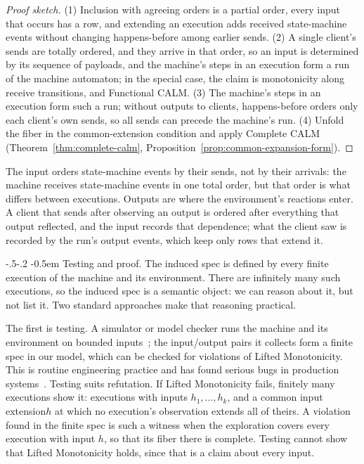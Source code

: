 \documentclass[sigconf]{cidr-2027}
\makeatletter
\theoremstyle{remark}
\renewcommand\paragraph{\@startsection{paragraph}{4}{\z@}%
  {-.5\baselineskip \@plus -2\p@ \@minus -.2\p@}%
  {-0.5em}%
  {\normalfont\bfseries}}
\newcommand{\indesc}{input extension\xspace} %
\newcommand{\outrel}{extends\xspace}          %
\newcommand{\outrelbase}{extend\xspace}       %
\makeatother
\begin{document}
\begin{proof}[Proof sketch]
(1) Inclusion with agreeing orders is a partial order, every input that occurs
has a row, and extending an execution adds received state-machine events without changing
happens-before among earlier sends.  (2) A single client's sends are totally
ordered, and they arrive in that order, so an input is determined by its
sequence of payloads, and the machine's steps in an execution form a run of
the machine automaton; in the special case, the claim is monotonicity along
receive transitions, and Functional CALM.  (3) The machine's steps in an
execution form such a run; without outputs to clients, happens-before orders
only each client's own sends, so all sends can precede the machine's run.  (4) Unfold the fiber in the
common-extension condition and apply Complete CALM
(Theorem~\ref{thm:complete-calm}, Proposition~\ref{prop:common-expansion-form}).
\end{proof}

The input orders state-machine events by their sends, not by their arrivals: the machine
receives state-machine events in one total order, but that order is what differs between
executions.  Outputs are where the environment's reactions enter.  A client
that sends after observing an output is ordered after everything that output
reflected, and the input records that dependence; what the client saw is
recorded by the run's output events, which keep only rows that \outrelbase
it.

\paragraph{Testing and proof.}
The induced spec is defined by every finite execution of the machine
and its environment.  There are infinitely many such executions, so the
induced spec is a semantic object: we can reason about it, but not
list it.  Two standard approaches make that reasoning practical.

The first is testing.  A simulator or model checker runs the machine and its
environment on bounded inputs~\cite{misra1986des,flanagan2005dpor}; the
input/output pairs it collects form a finite spec in our model,
which can be checked for violations of Lifted Monotonicity.  This is routine engineering
practice and has found serious bugs in production
systems~\cite{newcombe2015aws,zhou2021foundationdb}.  Testing suits
refutation.  If Lifted Monotonicity fails, finitely many executions show it:
executions with inputs $h_1,\ldots,h_k$, and a common \indesc $h$ at which no
execution's observation \outrel all of theirs.  A violation found in the
finite spec is such a witness when the exploration covers every
execution with input $h$, so that its fiber there is complete.  Testing cannot show that
Lifted Monotonicity holds, since that is a claim about every input.
\end{document}
